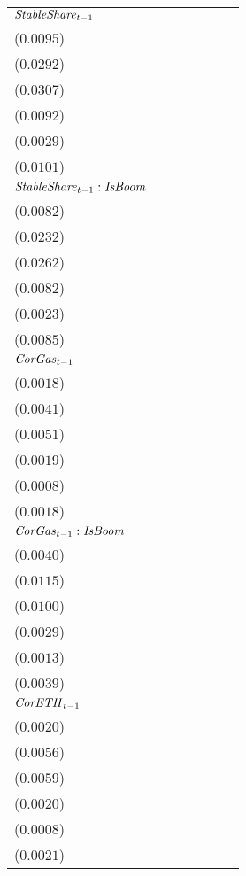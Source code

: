 \begin{tabular}{lllllll}
${\it StableShare}_{t-1}$ & \makecell{$0.0641^{***}$ \\ ($0.0095$)} & \makecell{$0.2524^{***}$ \\ ($0.0292$)} & \makecell{$0.1813^{***}$ \\ ($0.0307$)} & \makecell{$0.0594^{***}$ \\ ($0.0092$)} & \makecell{$0.0112^{***}$ \\ ($0.0029$)} & \makecell{$0.0679^{***}$ \\ ($0.0101$)} \\
${\it StableShare}_{t-1}:{\it IsBoom}$ & \makecell{$-0.0370^{***}$ \\ ($0.0082$)} & \makecell{$-0.0619^{***}$ \\ ($0.0232$)} & \makecell{$-0.1100^{***}$ \\ ($0.0262$)} & \makecell{$-0.0382^{***}$ \\ ($0.0082$)} & \makecell{$-0.0032^{}$ \\ ($0.0023$)} & \makecell{$-0.0387^{***}$ \\ ($0.0085$)} \\
${\it CorGas}_{t-1}$ & \makecell{$-0.0015^{}$ \\ ($0.0018$)} & \makecell{$0.0035^{}$ \\ ($0.0041$)} & \makecell{$-0.0035^{}$ \\ ($0.0051$)} & \makecell{$0.0008^{}$ \\ ($0.0019$)} & \makecell{$0.0009^{}$ \\ ($0.0008$)} & \makecell{$-0.0020^{}$ \\ ($0.0018$)} \\
${\it CorGas}_{t-1}:{\it IsBoom}$ & \makecell{$0.0031^{}$ \\ ($0.0040$)} & \makecell{$-0.0147^{}$ \\ ($0.0115$)} & \makecell{$0.0178^{*}$ \\ ($0.0100$)} & \makecell{$0.0044^{}$ \\ ($0.0029$)} & \makecell{$0.0011^{}$ \\ ($0.0013$)} & \makecell{$0.0047^{}$ \\ ($0.0039$)} \\
${\it CorETH}_{t-1}$ & \makecell{$-0.0020^{}$ \\ ($0.0020$)} & \makecell{$-0.0127^{**}$ \\ ($0.0056$)} & \makecell{$-0.0046^{}$ \\ ($0.0059$)} & \makecell{$-0.0006^{}$ \\ ($0.0020$)} & \makecell{$-0.0001^{}$ \\ ($0.0008$)} & \makecell{$-0.0022^{}$ \\ ($0.0021$)} \\

\end{tabular}
